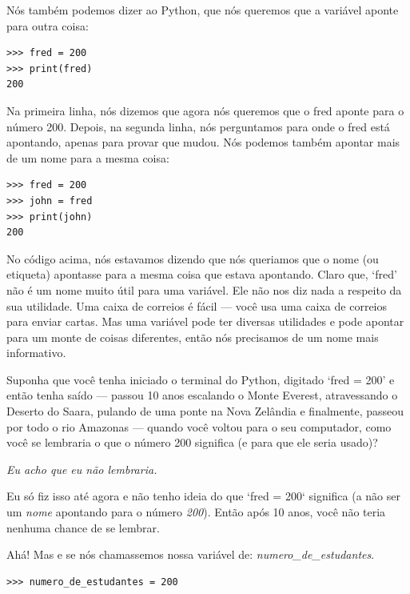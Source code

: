 Nós também podemos dizer ao Python, que nós queremos que a variável  aponte para outra coisa:

\begin{listing}
\begin{verbatim}
>>> fred = 200
>>> print(fred)
200
\end{verbatim}
\end{listing}

\noindent
Na primeira linha, nós dizemos que agora nós queremos que o fred aponte para o número 200. Depois, na segunda linha, nós perguntamos para onde o fred está apontando, apenas para provar que mudou. Nós podemos também apontar mais de um nome para a mesma coisa:

\begin{listing}
\begin{verbatim}
>>> fred = 200
>>> john = fred
>>> print(john)
200
\end{verbatim}
\end{listing}

No código acima, nós estavamos dizendo que nós queriamos que o nome (ou etiqueta)  apontasse para a mesma coisa que  estava apontando.
Claro que, `fred' não é um nome muito útil para uma variável. Ele não nos diz nada a respeito da sua utilidade. Uma caixa de correios é fácil --- você usa uma caixa de correios para enviar cartas. Mas uma variável pode ter diversas utilidades e pode apontar para um monte de coisas diferentes, então nós precisamos de um nome mais informativo.
\par
Suponha que você tenha iniciado o terminal do Python, digitado `fred = 200' e então tenha saído --- passou 10 anos escalando o Monte Everest, atravessando o Deserto do Saara, pulando de uma ponte na Nova Zelândia e finalmente, passeou por todo o rio Amazonas --- quando você voltou para o seu computador, como você se lembraria o que o número 200 significa (e para que ele seria usado)?

\noindent
\emph{Eu acho que eu não lembraria.}

\noindent
Eu só fiz isso até agora e não tenho ideia do que `fred = 200` significa (a não ser um \emph{nome} apontando para o número \emph{200}). Então após 10 anos, você não teria nenhuma chance de se lembrar.
\par
Ahá! Mas e se nós chamassemos nossa variável de: \emph{numero\_de\_estudantes}.

\begin{listing}
\begin{verbatim}
>>> numero_de_estudantes = 200
\end{verbatim}
\end{listing}

